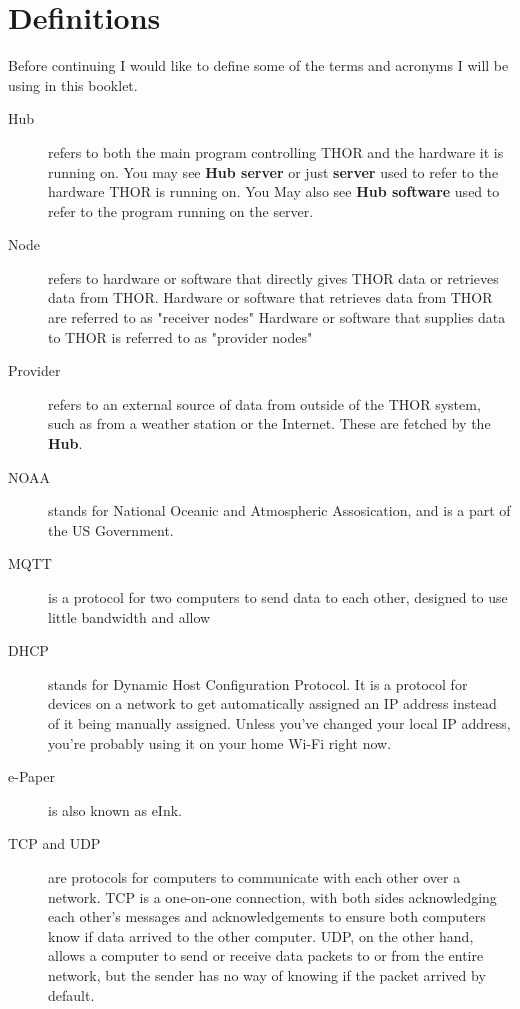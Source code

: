 \documentclass{report}
\begin{document}
		\section{Definitions}
	
	Before continuing I would like to define some of the terms and acronyms I will be using in this booklet.
	
	\begin{description}
		\item[Hub] refers to both the main program controlling THOR and the hardware it is running on.
		\subitem You may see \textbf{Hub server} or just \textbf{server} used to refer to the hardware THOR is running on.
		\subitem You May also see \textbf{Hub software} used to refer to the program running on the server.
		
		\item[Node] refers to hardware or software that directly gives THOR data or retrieves data from THOR.
		\subitem  Hardware or software that retrieves data from THOR are referred to as "receiver nodes"
		\subitem Hardware or software that supplies data to THOR is referred to as "provider nodes"
		
		\item[Provider] refers to an external source of data from outside of the THOR system, such as from a weather station or the Internet. These are fetched by the \textbf{Hub}.
		
		\item[NOAA] stands for National Oceanic and Atmospheric Assosication, and is a part of the US Government.
		
		\item[MQTT] is a protocol for two computers to send data to each other, designed to use little bandwidth and allow
		
		\item[DHCP] stands for Dynamic Host Configuration Protocol. It is a protocol for devices on a network to get automatically assigned an IP address instead of it being manually assigned. Unless you've  changed your local IP address, you're probably using it on your home Wi-Fi right now.
		
		\item[e-Paper] is also known as eInk.
		
		\item[TCP and UDP] are protocols for computers to communicate with each other over a network. TCP is a one-on-one connection, with both sides acknowledging each other's messages and acknowledgements to ensure both computers know if data arrived to the other computer. UDP, on the other hand, allows a computer to send or receive data packets to or from the entire network, but the sender has no way of knowing if the packet arrived by default.
		

\end{description}
\end{document}
